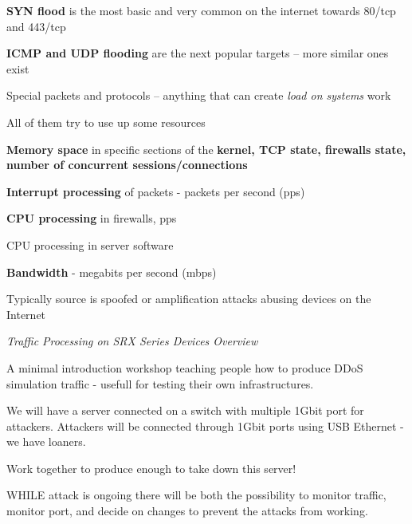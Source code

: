 \documentclass[Screen16to9,17pt]{foils}
\begin{document}
\begin{list2}
\item {\bf SYN flood} is the most basic and very common on the internet towards 80/tcp and 443/tcp
\item {\bf ICMP and UDP flooding} are the next popular targets -- more similar ones exist
\item Special packets and protocols -- anything that can create \emph{load on systems} work
\item All of them try to use up some resources
\begin{list2}
\item {\bf Memory space} in specific sections of the {\bf kernel, TCP state, firewalls state, number of concurrent sessions/connections}
\item {\bf Interrupt processing} of packets - packets per second (pps)
\item {\bf CPU processing} in firewalls, pps
\item CPU processing in server software
\item {\bf Bandwidth} - megabits per second (mbps)
\item Typically source is spoofed or amplification attacks abusing devices on the Internet
\end{list2}
\end{list2}



\emph{Traffic Processing on SRX Series Devices Overview}\\ {\scriptsize
{}}




A minimal introduction workshop teaching people how to produce DDoS simulation traffic - usefull for testing their own infrastructures.

We will have a server connected on a switch with multiple 1Gbit port for attackers. Attackers will be connected through 1Gbit ports using USB Ethernet - we have loaners.

Work together to produce enough to take down this server!

WHILE attack is ongoing there will be both the possibility to monitor traffic, monitor port, and decide on changes to prevent the attacks from working.
\end{document}
